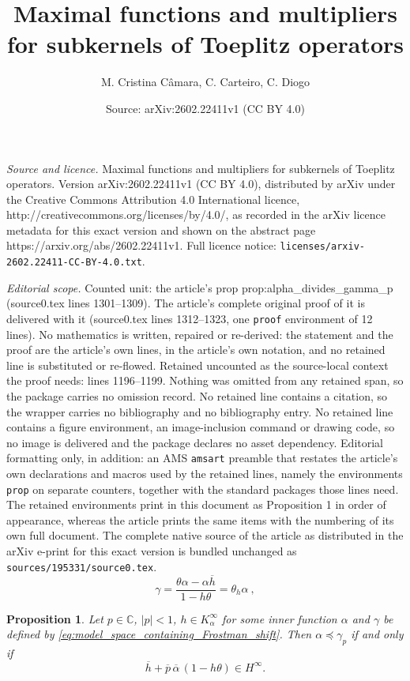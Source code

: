 \documentclass[10pt,a4paper]{amsart}
\title{Maximal functions and multipliers for subkernels of Toeplitz operators}
\author{M. Cristina C\^amara, C. Carteiro, C. Diogo}
\date{Source: arXiv:2602.22411v1 (CC BY 4.0)}
\newtheorem{prop}{Proposition}
\newcommand{\CC}{\ensuremath{\mathbb{C}}}
\newcommand{\Hinf}{\ensuremath{H^\infty}}
\newcommand{\ol}[1]{\ensuremath{\overline{#1}}}
\begin{document}
\maketitle

\noindent\emph{Source and licence.} Maximal functions and multipliers for subkernels of Toeplitz operators. Version arXiv:2602.22411v1 (CC BY 4.0), distributed by arXiv under the Creative Commons Attribution 4.0 International licence, http://creativecommons.org/licenses/by/4.0/, as recorded in the arXiv licence metadata for this exact version and shown on the abstract page https://arxiv.org/abs/2602.22411v1. Full licence notice: \texttt{licenses/arxiv-2602.22411-CC-BY-4.0.txt}.\par\smallskip

\noindent\textit{Editorial scope.} Counted unit: the article's prop prop:alpha\_divides\_gamma\_p (source0.tex lines 1301--1309). The article's complete original proof of it is delivered with it (source0.tex lines 1312--1323, one \texttt{proof} environment of 12 lines). No mathematics is written, repaired or re-derived: the statement and the proof are the article's own lines, in the article's own notation, and no retained line is substituted or re-flowed.  Retained uncounted as the source-local context the proof needs: lines 1196--1199.  Nothing was omitted from any retained span, so the package carries no omission record.  No retained line contains a citation, so the wrapper carries no bibliography and no bibliography entry.  No retained line contains a figure environment, an image-inclusion command or drawing code, so no image is delivered and the package declares no asset dependency.  Editorial formatting only, in addition: an AMS \texttt{amsart} preamble that restates the article's own declarations and macros used by the retained lines, namely the environments \texttt{prop} on separate counters, together with the standard packages those lines need.  The retained environments print in this document as Proposition 1 in order of appearance, whereas the article prints the same items with the numbering of its own full document.  The complete native source of the article as distributed in the arXiv e-print for this exact version is bundled unchanged as \texttt{sources/195331/source0.tex}.
\begin{equation}
\label{eq:model_space_containing_Frostman_shift}
\gamma = \frac{\theta \alpha - \alpha \ol h}{1 - h\theta} = \theta_h \alpha \ ,
\end{equation}

\begin{prop}
\label{prop:alpha_divides_gamma_p}
Let $p\in\CC$, $|p|<1$, $h\in K_\alpha^\infty$ for some inner function $\alpha$ and $\gamma$ be defined by \eqref{eq:model_space_containing_Frostman_shift}.
Then $\alpha \preceq \gamma_p$ if and only if
\begin{equation}
\label{eq:gamma_p_alpha_is_model_space}
\ol h + \ol p\, \ol\alpha \, (1 - h\theta) \in \Hinf.
\end{equation}
\end{prop}
\end{document}
